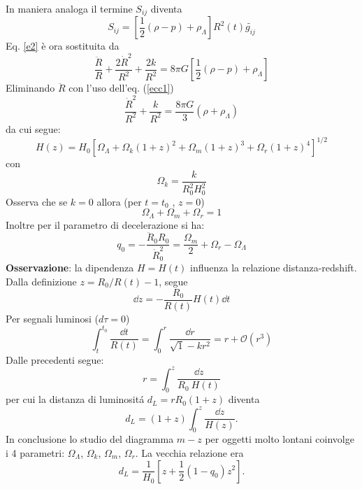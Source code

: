 In maniera analoga il termine $S_{ij}$ diventa
\begin{equation}
  S_{ij}= \left[ \frac {1}{2}(\rho-p)  + \rho_{\Lambda} \right] R^2(t) \tilde{g_{ij}}
  \label{sijcc}
\end{equation}
Eq. \eqref{e2}  è ora sostituita da
\begin{equation}
  \frac {\ddot{R}}{R}+\frac{2\dot{R}^2}{R^2}+\frac{2k}{R^2}=
  8 \pi G \left[ \frac{1}{2}(\rho-p) +\rho_{\Lambda} \right]
  \label{ecc1}
\end{equation}
Eliminando $\ddot R$ con l'uso dell'eq. (\ref{ecc1})
\begin{equation}
  \frac  {\dot{R}^2} {R^2} +\frac {k}{R^2} = \frac {8 \pi G}{3} (\rho+\rho_{\Lambda})
\end{equation}
da cui segue:
\begin{equation}
  H(z)=H_0 \left[\Omega_{\Lambda}+\Omega_{k}(1+z)^2+\Omega_m (1+z)^3+\Omega_r (1+z)^4\right]^{1/2}
  \label{hzcc}
\end{equation}
con
\begin{equation}
  \Omega_k = \frac {k}{R_0^2 H_0^2}
\end{equation}
Osserva che se $k=0$ allora (per $t=t_0$ , $z=0$)
\begin{equation}
  \Omega_{\Lambda} + \Omega_m  + \Omega_r = 1
\end{equation}
Inoltre per il parametro di decelerazione si ha:
\begin{equation}
  q_0= -\frac {\ddot R_0 R_0}{\dot R_0^2} = \frac{\Omega_m}{2} + \Omega_r -\Omega_{\Lambda}
  \label{q0cc}
\end{equation}
{\bf Osservazione}: la dipendenza $H=H(t)$ influenza la relazione
distanza-redshift.  Dalla definizione $z=R_0/R(t) -1$, segue
\begin{equation}
  \dd z = -\frac {R_0}{R(t)} H(t) \dd t
\end{equation}
Per segnali luminosi ($d \tau=0$)
\begin{equation}
  \int_t^{t_0} \frac {\dd t}{R(t)}= \int_0^{r} \frac {\dd r}{\sqrt1-kr^2} = r +
  \mathcal{O}(r^3)
\end{equation}
Dalle precedenti segue:
\begin{equation}
  r= \int_0^z \frac{\dd z}{R_0 ~ H(t)}
\end{equation}
per cui la distanza di luminosit\'a $d_L= r R_0 (1+z)$ diventa
\begin{equation}
  d_L = (1+z) \int_0^z \frac{\dd z}{H(z)}.
\end{equation}
In conclusione lo studio del diagramma $m-z$ per oggetti molto lontani coinvolge
i 4 parametri: $\Omega_{\Lambda}$, $\Omega_{k}$, $\Omega_{m}$, $\Omega_{r}$.  La
vecchia relazione era
\begin{equation}
  d_L = \frac {1}{H_0} \left[ z+ \frac{1}{2}(1-q_0)z^2\right].
\end{equation}

